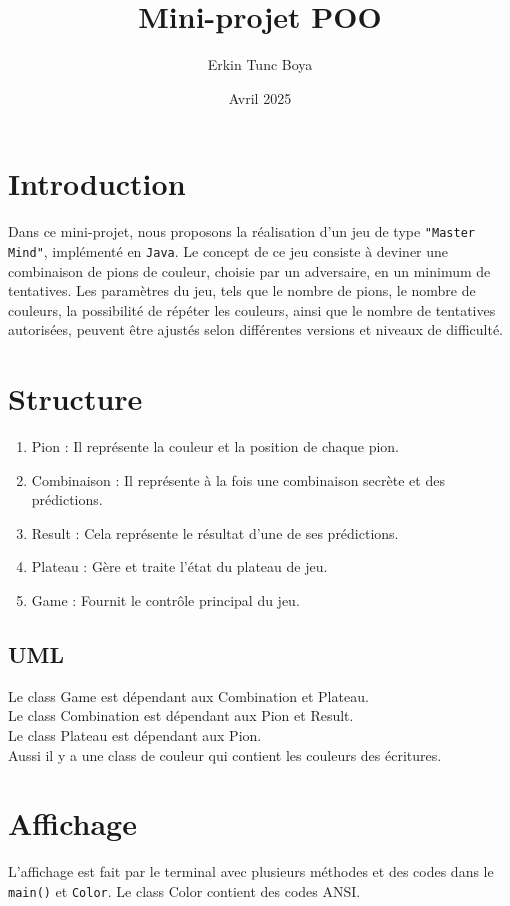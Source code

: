\documentclass[french,a4paper]{article} %
\title{Mini-projet POO}
\author{Erkin Tunc Boya}
\date{Avril 2025}
\begin{document}
\maketitle

\section{Introduction}
Dans ce mini-projet, nous proposons la réalisation d'un jeu de type \texttt{"Master Mind"}, implémenté en \texttt{Java}. Le concept de ce jeu consiste à deviner une combinaison de pions de couleur, choisie par un adversaire, en un minimum de tentatives. Les paramètres du jeu, tels que le nombre de pions, le nombre de couleurs, la possibilité de répéter les couleurs, ainsi que le nombre de tentatives autorisées, peuvent être ajustés selon différentes versions et niveaux de difficulté.


\section{Structure}

\begin{enumerate}
    \item Pion : Il représente la couleur et la position de chaque pion. 
    \item Combinaison :  Il représente à la fois une combinaison secrète et des prédictions.
    \item Result : Cela représente le résultat d’une de ses prédictions.
    \item Plateau : Gère et traite l’état du plateau de jeu.
    \item Game : Fournit le contrôle principal du jeu.
\end{enumerate}

\subsection{UML}


 

\noindent Le class Game est dépendant aux Combination et Plateau.\\
Le class Combination est dépendant aux Pion et Result.\\
Le class Plateau est dépendant aux Pion.\\
Aussi il y a une class de couleur qui contient les couleurs des écritures.

\section{Affichage}
L'affichage est fait par le terminal avec plusieurs méthodes et des codes dans le \texttt{main()} et \texttt{Color}. Le class Color contient des codes ANSI.
\end{document}
